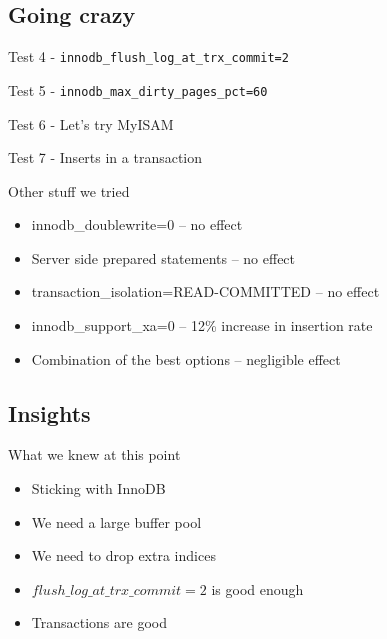 \documentclass{beamer}
\begin{document}
\subsection{Going crazy}

\begin{frame}{Test 4 - \texttt{innodb\_flush\_log\_at\_trx\_commit=2}}
\end{frame}

\begin{frame}{Test 5 - \texttt{innodb\_max\_dirty\_pages\_pct=60}}
\end{frame}

\begin{frame}{Test 6 - Let's try MyISAM}
\end{frame}

\begin{frame}{Test 7 - Inserts in a transaction}
\end{frame}

\begin{frame}{Other stuff we tried}
  \begin{itemize}
  \item innodb\_doublewrite=0 -- no effect
  \item Server side prepared statements -- no effect
  \item transaction\_isolation=READ-COMMITTED -- no effect
  \item innodb\_support\_xa=0 -- 12\% increase in insertion rate
  \item Combination of the best options -- negligible effect
  \end{itemize}
\end{frame}

\subsection{Insights}
\begin{frame}{What we knew at this point}
  \begin{itemize}
  \item Sticking with InnoDB
  \item We need a large buffer pool
  \item We need to drop extra indices
  \item $ flush\_log\_at\_trx\_commit=2 $ is good enough
  \item Transactions are good
  \end{itemize}
\end{frame}
\end{document}

